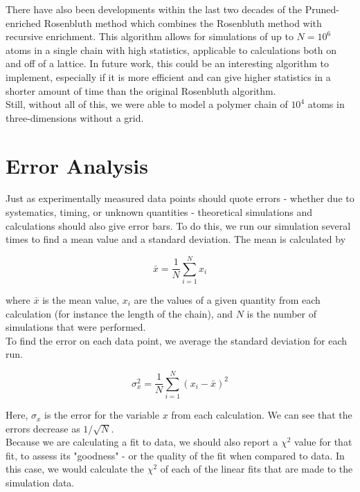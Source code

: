 \documentclass{article}
\begin{document}
\begin{multicols}{2}
There have also been developments within the last two decades of the Pruned-enriched Rosenbluth method which combines the Rosenbluth method with recursive enrichment.  This algorithm allows for simulations of up to $N=10^6$ atoms in a single chain with high statistics, applicable to calculations both on and off of a lattice.  \cite{PERM}  In future work, this could be an interesting algorithm to implement, especially if it is more efficient and can give higher statistics in a shorter amount of time than the original Rosenbluth algorithm.  \\

Still, without all of this, we were able to model a polymer chain of $10^4$ atoms in three-dimensions without a grid.  \\

\appendix

\section{Error Analysis}

Just as experimentally measured data points should quote errors - whether due to systematics, timing, or unknown quantities - theoretical simulations and calculations should also give error bars.  To do this, we run our simulation several times to find a mean value and a standard deviation.  The mean is calculated by

\begin{equation}
\bar x = \frac{1}{N} \sum \limits _{i=1}^N x_i
\end{equation}

\noindent where $\bar x$ is the mean value, $x_i$ are the values of a given quantity from each calculation (for instance the length of the chain), and $N$ is the number of simulations that were performed.\\

To find the error on each data point, we average the standard deviation for each run.

\begin{equation}
\label{stddev}
\sigma _x^2 = \frac{1}{N} \sum \limits _{i=1} ^N (x_i - \bar x)^2
\end{equation}

\noindent Here, $\sigma _x$ is the error for the variable $x$ from each calculation.  We can see that the errors decrease as $1/\sqrt{N}$.  \\

Because we are calculating a fit to data, we should also report a $\chi ^2$ value for that fit, to assess its "goodness" - or the quality of the fit when compared to data.  \cite{Nunes}  In this case, we would calculate the $\chi^2$ of each of the linear fits that are made to the simulation data.


\end{multicols}
\end{document}
